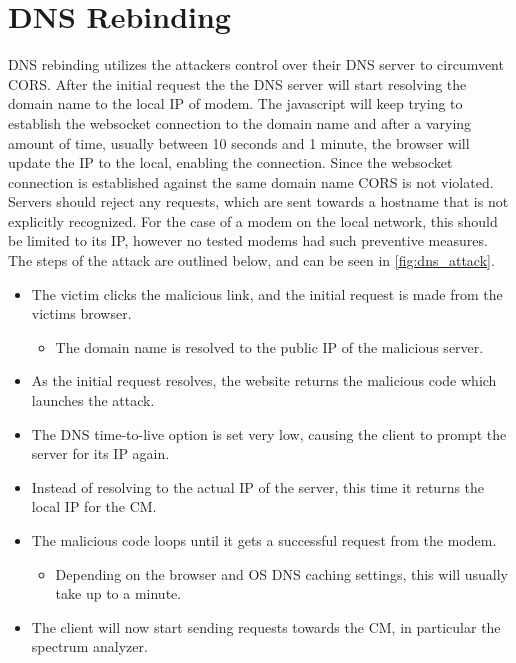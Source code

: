 \section{DNS Rebinding}
DNS rebinding utilizes the attackers control over their DNS server to circumvent CORS. After the initial request the the DNS server will start resolving the domain name to the local IP of modem. The javascript will keep trying to establish the websocket connection to the domain name and after a varying amount of time, usually between 10 seconds and 1 minute, the browser will update the IP to the local, enabling the connection. Since the websocket connection is established against the same domain name CORS is not violated. Servers should reject any requests, which are sent towards a hostname that is not explicitly recognized. For the case of a modem on the local network, this should be limited to its IP, however no tested modems had such preventive measures.
The steps of the attack are outlined below, and can be seen in \cref{fig:dns_attack}.

\begin{itemize}
    \item The victim clicks the malicious link, and the initial request is made from the victims browser.
    \begin{itemize}
      \item The domain name is resolved to the public IP of the malicious server.
    \end{itemize}
    \item As the initial request resolves, the website returns the malicious code which launches the attack.
    \item The DNS time-to-live option is set very low, causing the client to prompt the server for its IP again.
    \item Instead of resolving to the actual IP of the server, this time it returns the local IP for the CM.
    \item The malicious code loops until it gets a successful request from the modem.
    \begin{itemize}
        \item Depending on the browser and OS DNS caching settings, this will usually take up to a minute.
    \end{itemize}
    \item The client will now start sending requests towards the CM, in particular the spectrum analyzer.
\end{itemize}

